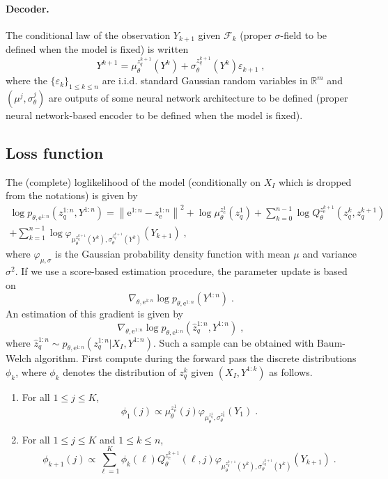 \documentclass{article}
\newcommand{\rset}{\ensuremath{\mathbb{R}}}
\newcommand{\eqsp}{\;}
\newcommand{\rme}{\mathrm{e}}
\begin{document}
\paragraph{Decoder.} The conditional law of the observation $Y_{k+1}$ given $\mathcal{F}_k$ (proper $\sigma$-field to be defined when the model is fixed) is written
$$
Y^{k+1} = \mu^{z_q^{k+1}}_\theta \!\!\!\!\!(Y^{k}) + \sigma^{z_q^{k+1}}_\theta\!\!\!\!\!(Y^{k})\varepsilon_{k+1}\eqsp,
$$
where the $\{\varepsilon_{k}\}_{1\leqslant k\leqslant n}$ are i.i.d. standard Gaussian random variables in $\rset^m$ and $(\mu^{j},\sigma^{j}_\theta)$ are outputs of some neural network architecture to be defined  (proper neural network-based encoder  to be defined when the model is fixed).

\subsection{Loss function}
The (complete) loglikelihood of the model (conditionally on $X_I$ which is dropped from the notations) is given by
\begin{align*}
\log p_{\theta,\rme^{1:n}}(z_q^{1:n},Y^{1:n}) = \left\|\rme^{1:n} - z_\rme^{1:n}\right\|^2 + \log \mu^{z_\rme^1}_{\theta}(z_q^1) + \sum_{k=0}^{n-1} \log  Q^{z_\rme^{k+1}}_{\theta}(z_q^k,z_q^{k+1})\\
+ \sum_{k=1}^{n-1} \log \varphi_{\mu^{z_q^{k+1}}_\theta\!\!\!\!\!(Y^{k}),\sigma^{z_q^{k+1}}_\theta\!\!\!\!\!(Y^{k})}(Y_{k+1}) \eqsp,
\end{align*}
where $\varphi_{\mu,\sigma}$ is the Gaussian probability density function with mean $\mu$ and variance $\sigma^2$. If we use a score-based estimation procedure, the parameter update is based on 
$$
\nabla_{\theta,\rme^{1:n}}\log p_{\theta,\rme^{1:n}}(Y^{1:n})\eqsp.
$$
An estimation of this gradient is given by 
$$
\nabla_{\theta,\rme^{1:n}} \log p_{\theta,\rme^{1:n}}(\hat z_q^{1:n},Y^{1:n})\eqsp,
$$
where $\hat z_q^{1:n} \sim p_{\theta,\rme^{1:n}}(z_q^{1:n}|X_I,Y^{1:n})$. Such a sample can be obtained with Baum-Welch algorithm.
First compute during the forward pass the discrete distributions $\phi_k$, where $\phi_k$ denotes the distribution of $z_q^k$ given $(X_I,Y^{1:k})$ as follows.
\begin{enumerate}
\item For all $1\leqslant j \leqslant K$, 
$$
\phi_1(j) \propto \mu^{z_\rme^1}_{\theta}(j) \varphi_{\mu^{z_q^{1}}_\theta,\sigma^{z_q^{1}}_\theta}(Y_1)\eqsp.
$$
\item For all $1\leqslant j \leqslant K$ and  $1\leqslant k \leqslant n$,
$$
\phi_{k+1}(j) \propto \sum_{\ell=1}^K \phi_{k}(\ell)  Q^{z_\rme^{k+1}}_{\theta}(\ell,j) \varphi_{\mu^{z_q^{k+1}}_\theta\!\!\!\!\!(Y^{k}),\sigma^{z_q^{k+1}}_\theta\!\!\!\!\!(Y^{k})}(Y_{k+1})\eqsp.
$$
\end{enumerate}
\end{document}
